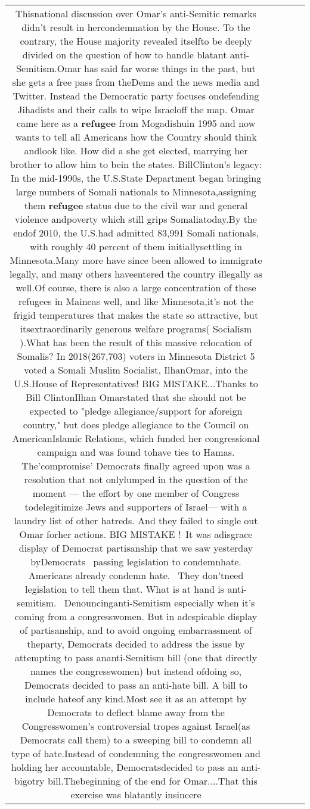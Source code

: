 \documentclass[11pt]{article}
\newlength\mylength
\begin{document}
\begin{center}
\begin{longtable}{|C{.65\mylength}|C{.30\mylength}|C{.12\mylength}|C{.12\mylength}|C{.12\mylength}|}
  \small Thisnational discussion over Omar's anti-Semitic remarks didn't result in hercondemnation by the House. To the contrary, the House majority revealed itselfto be deeply divided on the question of how to handle blatant anti-Semitism.Omar has said far worse things in the past, but she gets a free pass from theDems and the news media and Twitter. Instead the Democratic party focuses ondefending Jihadists and their calls to wipe Israeloff the map. Omar came here as a \textbf{refugee} from Mogadishuin 1995 and now wants to tell all Americans how the Country should think andlook like. How did a she get elected, marrying her brother to allow him to bein the states. BillClinton's legacy: In the mid-1990s, the U.S.State Department began bringing large numbers of Somali nationals to Minnesota,assigning them \textbf{refugee} status due to the civil war and general violence andpoverty which still grips Somaliatoday.By the endof 2010, the U.S.had admitted 83,991 Somali nationals, with roughly 40 percent of them initiallysettling in Minnesota.Many more have since been allowed to immigrate legally, and many others haveentered the country illegally as well.Of course, there is also a large concentration of these refugees in Maineas well, and like Minnesota,it's not the frigid temperatures that makes the state so attractive, but itsextraordinarily generous welfare programs( Socialism ).What has been the result of this massive relocation of Somalis? In 2018(267,703) voters in Minnesota District 5 voted a Somali Muslim Socialist, IlhanOmar, into the U.S.House of Representatives! BIG MISTAKE...Thanks to Bill ClintonIlhan Omarstated that she should not be expected to "pledge allegiance/support for aforeign country," but does pledge allegiance to the Council on AmericanIslamic Relations, which funded her congressional campaign and was found tohave ties to Hamas. The'compromise' Democrats finally agreed upon was a resolution that not onlylumped in the question of the moment — the effort by one member of Congress todelegitimize Jews and supporters of Israel— with a laundry list of other hatreds. And they failed to single out Omar forher actions. BIG MISTAKE ! It was adisgrace display of Democrat partisanship that we saw yesterday byDemocrats  passing legislation to condemnhate. Americans already condemn hate.  They don'tneed legislation to tell them that. What is at hand is anti-semitism.  Denouncinganti-Semitism especially when it's coming from a congresswomen. But in adespicable display of partisanship, and to avoid ongoing embarrassment of theparty, Democrats decided to address the issue by attempting to pass ananti-Semitism bill (one that directly names the congresswomen) but instead ofdoing so, Democrats decided to pass an anti-hate bill. A bill to include hateof any kind.Most see it as an attempt by Democrats to deflect blame away from the Congresswomen's controversial tropes against Israel(as Democrats call them) to a sweeping bill to condemn all type of hate.Instead of condemning the congresswomen and holding her accountable, Democratsdecided to pass an anti-bigotry bill.Thebeginning of the end for Omar....That this exercise was blatantly insincere 
\end{longtable}
\end{center}
\end{document}
